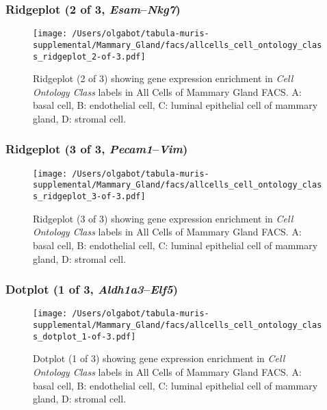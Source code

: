 \clearpage

\subsubsection{Ridgeplot (2 of 3, \emph{Esam}--\emph{Nkg7})}
\begin{figure}[h]
\centering
\texttt{[image: /Users/olgabot/tabula-muris-supplemental/Mammary\_Gland/facs/allcells\_cell\_ontology\_class\_ridgeplot\_2-of-3.pdf]}

\caption{ Ridgeplot (2 of 3)  showing gene expression enrichment in \emph{Cell Ontology Class} labels in All Cells of Mammary Gland FACS. A: basal cell, B: endothelial cell, C: luminal epithelial cell of mammary gland, D: stromal cell.}
\end{figure}


\clearpage

\subsubsection{Ridgeplot (3 of 3, \emph{Pecam1}--\emph{Vim})}
\begin{figure}[h]
\centering
\texttt{[image: /Users/olgabot/tabula-muris-supplemental/Mammary\_Gland/facs/allcells\_cell\_ontology\_class\_ridgeplot\_3-of-3.pdf]}

\caption{ Ridgeplot (3 of 3)  showing gene expression enrichment in \emph{Cell Ontology Class} labels in All Cells of Mammary Gland FACS. A: basal cell, B: endothelial cell, C: luminal epithelial cell of mammary gland, D: stromal cell.}
\end{figure}


\clearpage

\subsubsection{Dotplot (1 of 3, \emph{Aldh1a3}--\emph{Elf5})}
\begin{figure}[h]
\centering
\texttt{[image: /Users/olgabot/tabula-muris-supplemental/Mammary\_Gland/facs/allcells\_cell\_ontology\_class\_dotplot\_1-of-3.pdf]}

\caption{ Dotplot (1 of 3)  showing gene expression enrichment in \emph{Cell Ontology Class} labels in All Cells of Mammary Gland FACS. A: basal cell, B: endothelial cell, C: luminal epithelial cell of mammary gland, D: stromal cell.}
\end{figure}


